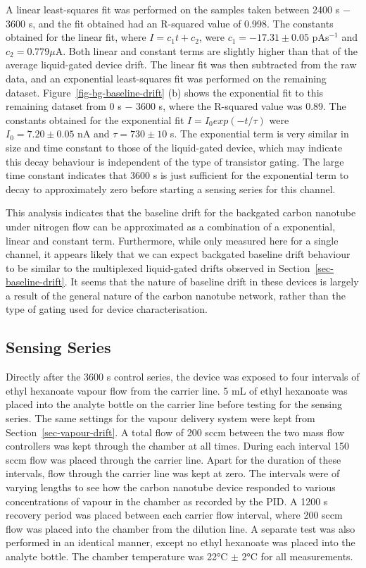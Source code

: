\documentclass[
  a4paper,
]{scrbook}
\begin{document}
A linear least-squares fit was performed on the samples taken between
2400 s \(-\) 3600 s, and the fit obtained had an R-squared value of
0.998. The constants obtained for the linear fit, where
\(I = c_1t + c_2\), were \(c_1 = -17.31\pm0.05\) pAs\(^{-1}\) and
\(c_2 = 0.779 \mu\)A. Both linear and constant terms are slightly higher
than that of the average liquid-gated device drift. The linear fit was
then subtracted from the raw data, and an exponential least-squares fit
was performed on the remaining dataset.
Figure~\ref{fig-bg-baseline-drift} (b) shows the exponential fit to this
remaining dataset from 0 s \(-\) 3600 s, where the R-squared value was
0.89. The constants obtained for the exponential fit
\(I = I_0exp(-t/\tau)\) were \(I_0 = 7.20 \pm 0.05\) nA and
\(\tau = 730 \pm 10\) s. The exponential term is very similar in size
and time constant to those of the liquid-gated device, which may
indicate this decay behaviour is independent of the type of transistor
gating. The large time constant indicates that 3600 s is just sufficient
for the exponential term to decay to approximately zero before starting
a sensing series for this channel.

This analysis indicates that the baseline drift for the backgated carbon
nanotube under nitrogen flow can be approximated as a combination of a
exponential, linear and constant term. Furthermore, while only measured
here for a single channel, it appears likely that we can expect
backgated baseline drift behaviour to be similar to the multiplexed
liquid-gated drifts observed in Section~\ref{sec-baseline-drift}. It
seems that the nature of baseline drift in these devices is largely a
result of the general nature of the carbon nanotube network, rather than
the type of gating used for device characterisation.

\hypertarget{sec-EtHex-series}{%
\subsection{Sensing Series}\label{sec-EtHex-series}}

Directly after the 3600 s control series, the device was exposed to four
intervals of ethyl hexanoate vapour flow from the carrier line. 5 mL of
ethyl hexanoate was placed into the analyte bottle on the carrier line
before testing for the sensing series. The same settings for the vapour
delivery system were kept from Section~\ref{sec-vapour-drift}. A total
flow of 200 sccm between the two mass flow controllers was kept through
the chamber at all times. During each interval 150 sccm flow was placed
through the carrier line. Apart for the duration of these intervals,
flow through the carrier line was kept at zero. The intervals were of
varying lengths to see how the carbon nanotube device responded to
various concentrations of vapour in the chamber as recorded by the PID.
A 1200 s recovery period was placed between each carrier flow interval,
where 200 sccm flow was placed into the chamber from the dilution line.
A separate test was also performed in an identical manner, except no
ethyl hexanoate was placed into the analyte bottle. The chamber
temperature was 22°C \(\pm\) 2°C for all measurements.
\end{document}
